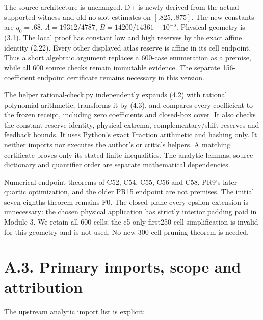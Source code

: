 \documentclass[11pt,a4paper]{article}
\begin{document}
The source architecture is unchanged. D+ is newly derived from the
actual supported witness and old no-slot estimates on \([.825,.875]\).
The new constants are \(q_0=.68\), \(\Lambda=19312/4787\),
\(B=14200/14361-10^{-5}\). Physical geometry is (3.1). The local proof
has constant low and high reserves by the exact affine identity (2.22).
Every other displayed atlas reserve is affine in its cell endpoint. Thus
a short algebraic argument replaces a 600-case enumeration as a premise,
while all 600 source checks remain immutable evidence. The separate
156-coefficient endpoint certificate remains necessary in this version.

The helper rational-check.py independently expands (4.2) with rational
polynomial arithmetic, transforms it by (4.3), and compares every
coefficient to the frozen receipt, including zero coefficients and
closed-box cover. It also checks the constant-reserve identity, physical
extrema, complementary/shift reserves and feedback bounds. It uses
Python's exact Fraction arithmetic and hashing only. It neither imports
nor executes the author's or critic's helpers. A matching certificate
proves only its stated finite inequalities. The analytic lemmas, source
dictionary and quantifier order are separate mathematical dependencies.

Numerical endpoint theorems of C52, C54, C55, C56 and C58, PR9's later
quartic optimization, and the older PR15 endpoint are not premises. The
initial seven-eighths theorem remains F0. The closed-plane every-epsilon
extension is unnecessary: the chosen physical application has strictly
interior padding paid in Module 3. We retain all 600 cells; the c5-only
first250-cell simplification is invalid for this geometry and is not
used. No new 300-cell pruning theorem is needed.

\hypertarget{a.3.-primary-imports-scope-and-attribution}{%
\section{A.3. Primary imports, scope and
attribution}\label{a.3.-primary-imports-scope-and-attribution}}

The upstream analytic import list is explicit:
\end{document}
